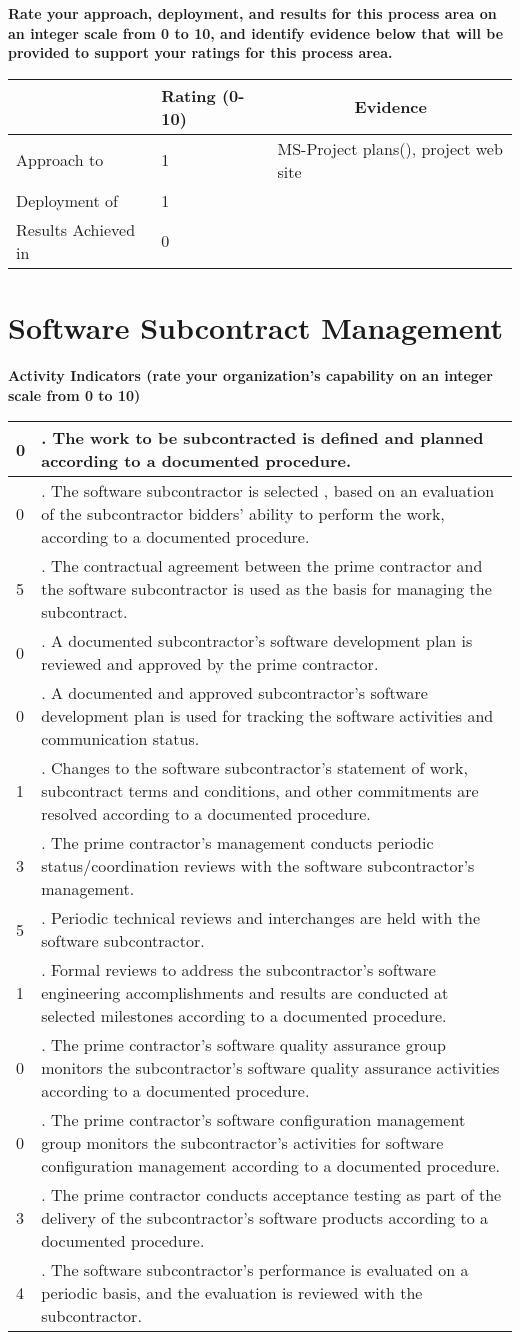 \documentclass{article}
\newcommand{\KPAname}{}
\let\KPAsection=\section
\renewcommand{\section}[1]{\renewcommand{\KPAname}{#1}\KPAsection{#1}}
\newcounter{activity}		%
\newenvironment{KPAActivity}
{
    \setcounter{activity}{0} %
    {\bf Activity Indicators (rate your organization's capability
    on an integer scale from 0 to 10)} %
    \begin{center}
    \begin{tabular}{|p{0.5in}|p{6.0in}|} \hline %
}
{
    \end{tabular}
    \end{center}
}
\newcommand{\Activity}[2]
{
    \stepcounter{activity} #1 & \arabic{activity}. #2 \\ \hline
} %
\newenvironment{KPARate}
{
    {\bf Rate your approach, deployment, and results for
    this process area on an integer scale from 0 to 10, and 
    identify evidence below that will be provided to support your
    ratings for this process area.}
    \begin{center}
    \begin{tabular}{|p{1.0in}|p{0.5in}|p{5.0in}|} \hline
    & Rating (0-10) & \multicolumn{1}{c|}{Evidence} \\ \hline
}
{
    \end{tabular}
    \end{center}
}
\newcommand{\Approach}[2]{Approach to \KPAname & #1 & #2 \\ \hline}
\newcommand{\Deployment}[2]{Deployment of \KPAname & #1 & #2 \\ \hline}
\newcommand{\Results}[2]{Results Achieved in \KPAname & #1 & #2 \\
	\hline}
\begin{document}
\begin{KPARate}
\Approach{1}{MS-Project plans(), project web site}
\Deployment{1}{}
\Results{0}{}
\end{KPARate}

\newpage
\section{Software Subcontract Management}

\begin{KPAActivity}
\Activity{0}{The work to be subcontracted is defined and planned
according to a documented procedure.}
\Activity{0}{The software subcontractor is selected , based on an
evaluation of the subcontractor bidders' ability to perform the work,
according to a documented procedure.}
\Activity{5}{The contractual agreement between the prime contractor
and the software subcontractor is used as the basis for managing the
subcontract.}
\Activity{0}{A documented subcontractor's software development plan is
reviewed and approved by the prime contractor.}
\Activity{0}{A documented and approved subcontractor's software
development plan is used for tracking the software activities and
communication status.}
\Activity{1}{Changes to the software subcontractor's statement of
work, subcontract terms and conditions, and other commitments are
resolved according to a documented procedure.}
\Activity{3}{The prime contractor's management conducts periodic
status/coordination reviews with the software subcontractor's
management.}
\Activity{5}{Periodic technical reviews and interchanges are held with
the software subcontractor.}
\Activity{1}{Formal reviews to address the subcontractor's software
engineering accomplishments and results are conducted at selected
milestones according to a documented procedure.}
\Activity{0}{The prime contractor's software quality assurance group
monitors the subcontractor's software quality assurance activities
according to a documented procedure.}
\Activity{0}{The prime contractor's software configuration management
group monitors the subcontractor's activities for software
configuration management according to a documented procedure.}
\Activity{3}{The prime contractor conducts acceptance testing as part
of the delivery of the subcontractor's software products according to
a documented procedure.}
\Activity{4}{The software subcontractor's performance is evaluated on
a periodic basis, and the evaluation is reviewed with the
subcontractor.}
\end{KPAActivity}
\end{document}
